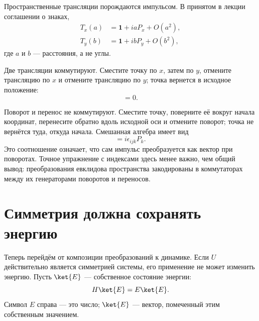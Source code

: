 Пространственные трансляции порождаются импульсом. В принятом в лекции соглашении о знаках,
\begin{equation}
\begin{aligned}
T_x(a)&=\mathbf 1+iaP_x+O(a^2),\\
T_y(b)&=\mathbf 1+ibP_y+O(b^2),
\end{aligned}
\end{equation}
где \(a\) и \(b\) — расстояния, а не углы.

Две трансляции коммутируют. Сместите точку по \(x\), затем по \(y\), отмените трансляцию по \(x\) и отмените трансляцию по \(y\); точка вернется в исходное положение:
\begin{equation}
[P_i,P_j]=0.
\end{equation}

\begin{classroomqa}
\end{classroomqa}

Поворот и перенос не коммутируют. Сместите точку, поверните её вокруг начала координат, перенесите обратно вдоль исходной оси и отмените поворот; точка не вернётся туда, откуда начала. Смешанная алгебра имеет вид
\begin{equation}
[L_i,P_j]=i\epsilon_{ijk}P_k.
\end{equation}
Это соотношение означает, что сам импульс преобразуется как вектор при поворотах. Точное упражнение с индексами здесь менее важно, чем общий вывод: преобразования евклидова пространства закодированы в коммутаторах между их генераторами поворотов и переносов.

\section{Симметрия должна сохранять энергию}

Теперь перейдём от композиции преобразований к динамике. Если \(U\) действительно является симметрией системы, его применение не может изменить энергию. Пусть \(\ket{E}\) — собственное состояние энергии:
\begin{equation}
H\ket{E}=E\ket{E}.
\end{equation}
Символ \(E\) справа — это число; \(\ket{E}\) — вектор, помеченный этим собственным значением.

